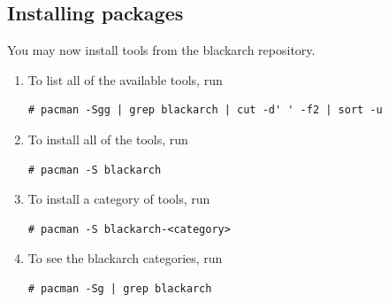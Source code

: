 \documentclass[a4paper, oneside, 11pt]{book}
\begin{document}
\subsection{Installing packages}
You may now install tools from the blackarch repository.
\begin{enumerate}
\item To list all of the available tools, run
{\small
\color{gray}
\begin{verbatim}
# pacman -Sgg | grep blackarch | cut -d' ' -f2 | sort -u
\end{verbatim}
}
\item To install all of the tools, run
{\small
\color{gray}
\begin{verbatim}
# pacman -S blackarch
\end{verbatim}
}
\item To install a category of tools, run
{\small
\color{gray}
\begin{verbatim}
# pacman -S blackarch-<category>
\end{verbatim}
}
\item To see the blackarch categories, run
{\small
\color{gray}
\begin{verbatim}
# pacman -Sg | grep blackarch
\end{verbatim}
}
\end{enumerate}
\end{document}
